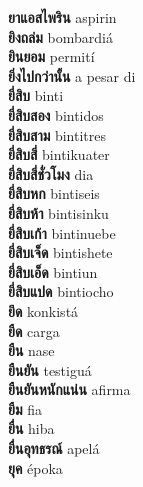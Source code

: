\textbf{ ยาแอสไพริน  } aspirin \\
\textbf{ ยิงถล่ม  } bombardiá \\
\textbf{ ยินยอม  } permití \\
\textbf{ ยิ่งไปกว่านั้น  } a pesar di \\
\textbf{ ยี่สิบ  } binti \\
\textbf{ ยี่สิบสอง  } bintidos \\
\textbf{ ยี่สิบสาม  } bintitres \\
\textbf{ ยี่สิบสี่  } bintikuater \\
\textbf{ ยี่สิบสี่ชั่วโมง  } dia \\
\textbf{ ยี่สิบหก  } bintiseis \\
\textbf{ ยี่สิบห้า  } bintisinku \\
\textbf{ ยี่สิบเก้า  } bintinuebe \\
\textbf{ ยี่สิบเจ็ด  } bintishete \\
\textbf{ ยี่สิบเอ็ด  } bintiun \\
\textbf{ ยี่สิบแปด  } bintiocho \\
\textbf{ ยึด  } konkistá \\
\textbf{ ยืด  } carga \\
\textbf{ ยืน  } nase \\
\textbf{ ยืนยัน  } testiguá \\
\textbf{ ยืนยันหนักแน่น  } afirma \\
\textbf{ ยืม  } fia \\
\textbf{ ยื่น  } hiba \\
\textbf{ ยื่นอุทธรณ์  } apelá \\
\textbf{ ยุค  } époka \\
